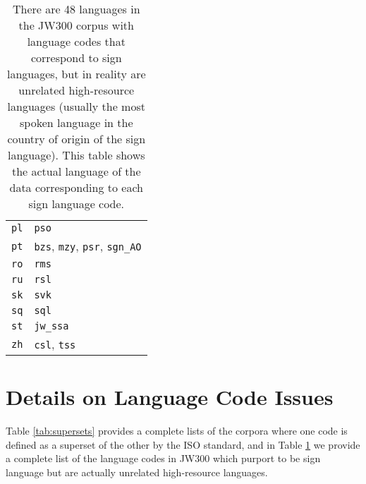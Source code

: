 \begin{table}[th!]
\begin{tabular}{ll}
        \texttt{pl}               & \texttt{pso}                                                          \\
        \texttt{pt}               & \texttt{bzs}, \texttt{mzy}, \texttt{psr}, \texttt{sgn\_AO}            \\
        \texttt{ro}               & \texttt{rms}                                                          \\
        \texttt{ru}               & \texttt{rsl}                                                          \\
        \texttt{sk}               & \texttt{svk}                                                          \\
        \texttt{sq}               & \texttt{sql}                                                          \\
        \texttt{st}               & \texttt{jw\_ssa}                                                      \\
        \texttt{zh}               & \texttt{csl}, \texttt{tss}                                            \\
        \bottomrule
    \end{tabular}
    \caption{There are 48 languages in the JW300 corpus with language codes that correspond to sign languages, but in reality are unrelated high-resource languages (usually the most spoken language in the country of origin of the sign language). This table shows the actual language of the data corresponding to each sign language code.} %
    \label{tab:signlanguages}
\end{table}

\section{Details on Language Code Issues}
\label{app:jw300}

Table \ref{tab:supersets} provides a complete lists of the corpora where one code is defined as a superset of the other by the ISO standard, and in Table \ref{tab:signlanguages} we provide a complete list of the language codes in JW300 which purport to be sign language but are actually unrelated high-resource languages.



